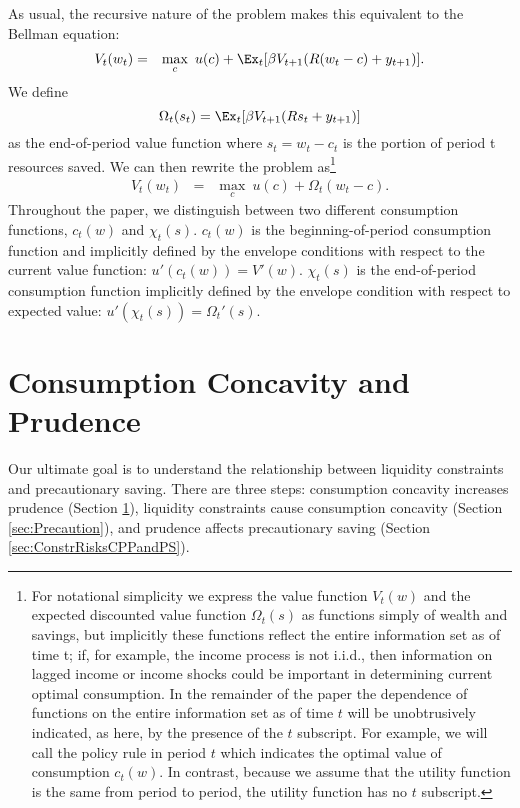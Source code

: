 \documentclass[titlepage]{\econtex}
\begin{document}
As usual, the recursive nature of the problem makes this equivalent to the Bellman equation:
\begin{eqnarray*}  \label{eq:recursiveV}
V_{t}(w_{t}) & = & \max_{c} ~ u(c) + \Ex_{t} [{\beta}
V_{t+1}(%
{R}(w_t - c) + {y}_{t+1})].
\end{eqnarray*}
We define
\begin{equation*} \label{eq:OmegaEV}
\Omega_t(s_t) = \Ex_t [ \beta V_{t+1}(R s_t + y_{t+1})]
\end{equation*}
as the end-of-period value function where $s_t = w_t - c_t$ is the portion of period t resources saved. We can then rewrite the problem as\footnote{For notational simplicity we express the value function $V_t(w)$ and the expected discounted value function $\Omega_{t}(s)$ as functions simply of wealth and savings, but implicitly these functions reflect the entire information set as of time t; if, for example, the income process is not i.i.d., then information on lagged income or income shocks could be important in determining current optimal consumption.  In the remainder of the paper the dependence of functions on the entire information set as of time $t$ will be unobtrusively indicated, as here, by the presence of the $t$ subscript. For example, we will call the policy rule in period $t$ which indicates the optimal value of consumption $c_{t}(w)$. In contrast, because we assume that the utility function is the same from period to period, the utility function has no $t$ subscript.}
\begin{eqnarray*}  \label{eq:subphi}
V_{t}(w_{t}) & = & \max_{c} ~ u(c) + \Omega_{t}(w_t - c).
\end{eqnarray*}
Throughout the paper, we distinguish between two different consumption functions, $c_t(w)$ and $\chi_t(s)$. $c_t(w)$ is the beginning-of-period consumption function and implicitly defined by the envelope conditions with respect to the current value function: $u'(c_t(w)) = V'(w)$. $\chi_t(s)$ is the end-of-period consumption function implicitly defined by the envelope condition with respect to expected value: $u'(\chi_t(s)) = \Omega_{t}'(s)$.


\hypertarget{PrudAndCC}{}
\section{Consumption Concavity and Prudence}\label{sec:PrudAndCC}


Our ultimate goal is to understand the relationship between liquidity
constraints and precautionary saving. There are three steps: consumption concavity increases prudence (Section \ref{sec:PrudAndCC}), liquidity constraints cause consumption concavity (Section \ref{sec:Precaution}), and prudence affects precautionary saving (Section \ref{sec:ConstrRisksCPPandPS}).
\end{document}
